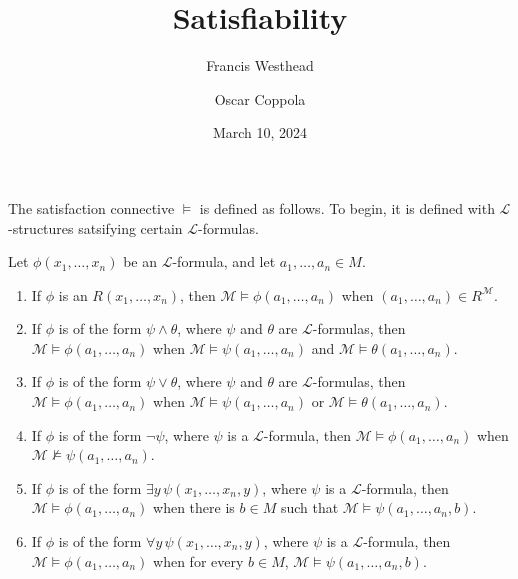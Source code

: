 \documentclass[a4paper]{article}
\title{Satisfiability}
\date{March 10, 2024}
\author{Francis Westhead \and Oscar Coppola}
\begin{document}
\maketitle
\par{
    The satisfaction connective \(\vDash\) is defined as follows.
    To begin, it is defined with \(\mathcal  L\)-structures satsifying certain \(\mathcal  L\)-formulas.
}\par{
    Let \(\phi (x_1, \dots ,x_n)\) be an \(\mathcal  L\)-formula, and let \(a_1, \dots ,a_n \in  M\).
    \begin{enumerate}
\item{
            If \(\phi\) is an  \(R(x_1, \dots ,x_n)\),
            then \(\mathcal  M \vDash \phi (a_1, \dots ,a_n)\) when \((a_1, \dots ,a_n) \in  R^{ \mathcal  M}\).
        }
        \item{
            If \(\phi\) is of the form \(\psi \land \theta\), where \(\psi\) and \(\theta\)
            are \(\mathcal  L\)-formulas, then \(\mathcal  M \vDash \phi (a_1, \dots ,a_n)\)
            when \(\mathcal  M \vDash \psi (a_1, \dots ,a_n)\) and \(\mathcal  M \vDash \theta (a_1, \dots ,a_n)\).
        }
        \item{
            If \(\phi\) is of the form \(\psi \lor \theta\), where \(\psi\) and \(\theta\)
            are \(\mathcal  L\)-formulas, then \(\mathcal  M \vDash \phi (a_1, \dots ,a_n)\)
            when \(\mathcal  M \vDash \psi (a_1, \dots ,a_n)\) or \(\mathcal  M \vDash \theta (a_1, \dots ,a_n)\).
        }
        \item{
            If \(\phi\) is of the form \(\neg \psi\), where \(\psi\) is a \(\mathcal  L\)-formula,
            then \(\mathcal  M \vDash \phi (a_1, \dots ,a_n)\) when \(\mathcal  M \not \vDash \psi (a_1, \dots ,a_n)\).
        }
        \item{
            If \(\phi\) is of the form \(\exists  y \, \psi (x_1, \dots ,x_n,y)\),
            where \(\psi\) is a \(\mathcal  L\)-formula, then \(\mathcal  M \vDash \phi (a_1, \dots ,a_n)\)
            when there is \(b \in  M\) such that \(\mathcal  M \vDash \psi (a_1, \dots ,a_n,b)\).
        }
        \item{
            If \(\phi\) is of the form \(\forall  y \, \psi (x_1, \dots ,x_n,y)\),
            where \(\psi\) is a \(\mathcal  L\)-formula, then \(\mathcal  M \vDash \phi (a_1, \dots ,a_n)\)
            when for every \(b \in  M\), \(\mathcal  M \vDash \psi (a_1, \dots ,a_n,b)\).
        }
\end{enumerate}}
\printbibliography
\end{document}
